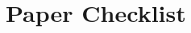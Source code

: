 %
%

\newcommand{\answerYes}[1]{\textbf{Yes} --- #1}
\newcommand{\answerNo}[1]{\textbf{No} --- #1}
\newcommand{\answerNA}[1]{\textbf{NA} --- #1}

\section{Paper Checklist}
\label{sec:checklist}

